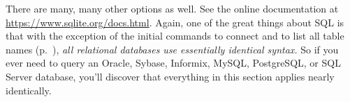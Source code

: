 
There are many, many other options as well. See the online documentation at
\url{https://www.sqlite.org/docs.html}. Again, one of the great things about
SQL is that with the exception of the initial commands to connect and to list
all table names (p.~\pageref{sqlite_master}), \textit{all relational databases
use essentially identical syntax.} So if you ever need to query an Oracle,
Sybase, Informix, MySQL, PostgreSQL, or SQL Server database, you'll discover
that everything in this section applies nearly identically.